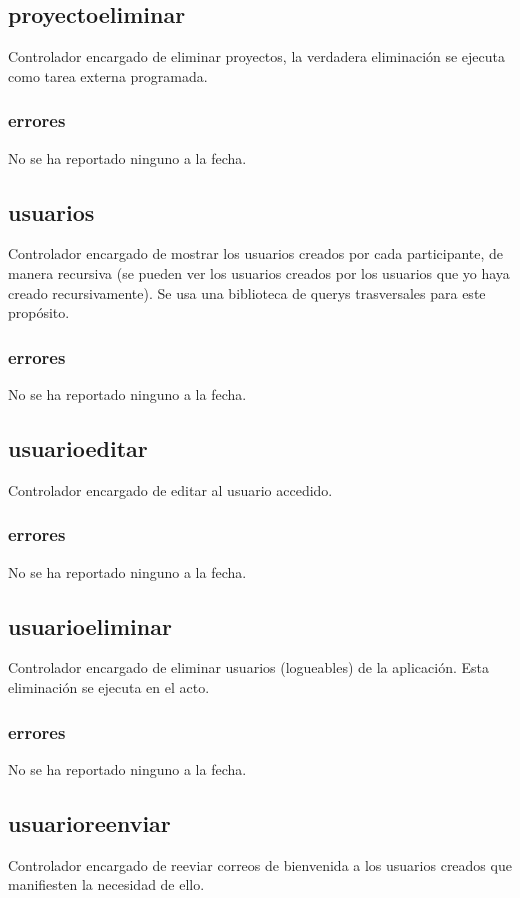 \documentclass[10pt,a4paper]{book}
\begin{document}
	\subsection{proyectoeliminar}
	Controlador encargado de eliminar proyectos, la verdadera eliminación se ejecuta como tarea externa programada.
	\subsubsection{errores}
	No se ha reportado ninguno a la fecha.
	
	\subsection{usuarios}
	Controlador encargado de mostrar los usuarios creados por cada participante, de manera recursiva (se pueden ver los usuarios creados por los usuarios que yo haya creado recursivamente). Se usa una biblioteca de querys trasversales para este propósito.
	\subsubsection{errores}
	No se ha reportado ninguno a la fecha.
	
	\subsection{usuarioeditar}
	Controlador encargado de editar al usuario accedido.
	\subsubsection{errores}
	No se ha reportado ninguno a la fecha.

	\subsection{usuarioeliminar}
	Controlador encargado de eliminar usuarios (logueables) de la aplicación. Esta eliminación se ejecuta en el acto.
	\subsubsection{errores}
	No se ha reportado ninguno a la fecha.

	\subsection{usuarioreenviar}
	Controlador encargado de reeviar correos de bienvenida a los usuarios creados que manifiesten la necesidad de ello.
\end{document}
